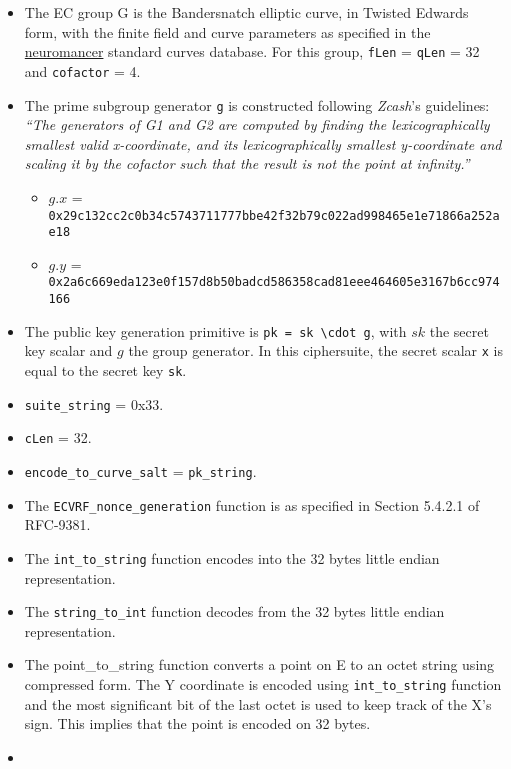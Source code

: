\documentclass[
]{article}
\providecommand{\tightlist}{%
  \setlength{\itemsep}{0pt}\setlength{\parskip}{0pt}}
\begin{document}
\begin{itemize}
\item
  The EC group G is the Bandersnatch elliptic curve, in Twisted Edwards
  form, with the finite field and curve parameters as specified in the
  \href{https://neuromancer.sk/std/bls/Bandersnatch}{neuromancer}
  standard curves database. For this group, \texttt{fLen} =
  \texttt{qLen} = 32 and \texttt{cofactor} = 4.
\item
  The prime subgroup generator \texttt{g} is constructed following
  \emph{Zcash}'s guidelines: \emph{``The generators of G1 and G2 are
  computed by finding the lexicographically smallest valid x-coordinate,
  and its lexicographically smallest y-coordinate and scaling it by the
  cofactor such that the result is not the point at infinity.''}

  \begin{itemize}
  \tightlist
  \item
    \(g.x\) =
    \texttt{0x29c132cc2c0b34c5743711777bbe42f32b79c022ad998465e1e71866a252ae18}
  \item
    \(g.y\) =
    \texttt{0x2a6c669eda123e0f157d8b50badcd586358cad81eee464605e3167b6cc974166}
  \end{itemize}
\item
  The public key generation primitive is
  \texttt{pk\ =\ sk\ \textbackslash{}cdot\ g}, with \(sk\) the secret
  key scalar and \(g\) the group generator. In this ciphersuite, the
  secret scalar \texttt{x} is equal to the secret key \texttt{sk}.
\item
  \texttt{suite\_string} = 0x33.
\item
  \texttt{cLen} = 32.
\item
  \texttt{encode\_to\_curve\_salt} = \texttt{pk\_string}.
\item
  The \texttt{ECVRF\_nonce\_generation} function is as specified in
  Section 5.4.2.1 of RFC-9381.
\item
  The \texttt{int\_to\_string} function encodes into the 32 bytes little
  endian representation.
\item
  The \texttt{string\_to\_int} function decodes from the 32 bytes little
  endian representation.
\item
  The point\_to\_string function converts a point on E to an octet
  string using compressed form. The Y coordinate is encoded using
  \texttt{int\_to\_string} function and the most significant bit of the
  last octet is used to keep track of the X's sign. This implies that
  the point is encoded on 32 bytes.
\item

\end{itemize}
\end{document}
